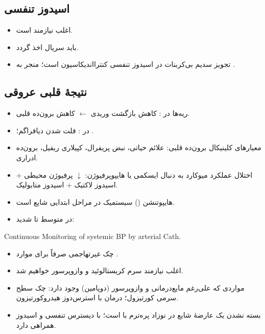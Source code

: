 \documentclass[12pt,a4paper]{article}
\begin{document}
\subsection*{اسیدوز تنفسی}
\begin{itemize}
\item اغلب نیازمند  است.
\item باید  سریال اخذ گردد.
\item تجویز سدیم بی‌کربنات در اسیدوز تنفسی کنترااندیکاسیون است؛ منجر به .
\end{itemize}
\subsection*{نتیجهٔ قلبی عروقی}
\begin{itemize}
\item {} ریه‌ها در : کاهش بازگشت وریدی $\leftarrow$ کاهش برون‌ده قلبی.
\item در : فلت شدن دیافراگم؛ .
\item معیارهای کلینیکال برون‌ده قلبی: علائم حیاتی، نبض پریفرال، کپیلاری ریفیل، برون‌ده ادراری.
\item اختلال عملکرد میوکارد به دنبال ایسکمی یا هایپوپرفیوژن: $\downarrow$ پرفیوژن محیطی + اسیدوز لاکتیک + اسیدوز متابولیک.
\end{itemize}

\begin{itemize}
\item هایپوتنشن () سیستمیک در مراحل ابتدایی  شایع است.
\item در  متوسط تا شدید:
\end{itemize}
\begin{latin}
Continuous Monitoring of systemic BP by arterial Cath.
\end{latin}
\begin{itemize}
\item چک غیرتهاجمی  صرفاً برای موارد .
\item اغلب نیازمند سرم کریستالوئید و وازوپرسور خواهیم شد.
\item مواردی که  علی‌رغم مایع‌درمانی و وازوپرسور (دوپامین) وجود دارد: چک سطح سرمی کورتیزول؛ درمان با استرس‌دوز هیدروکورتیزون.
\item بسته نشدن  یک عارضهٔ شایع در نوزاد پره‌ترم با  است؛ با دیسترس تنفسی و اسیدوز همراهی دارد.
\end{itemize}
\end{document}

